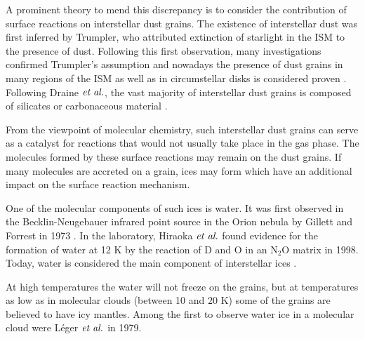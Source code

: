 \documentclass[8.5pt,twoside,twocolumn]{article}
\theoremstyle{standard}
\begin{document}
A prominent theory to mend this discrepancy is to consider the
contribution of surface reactions on interstellar dust
grains\cite{WilliamsHerbst2002}. The existence of interstellar dust was first
inferred by Trumpler\cite{Trumpler1930}, who attributed extinction of starlight
in the ISM to the presence of dust. Following this first observation, many
investigations confirmed Trumpler's assumption and nowadays the presence of
dust grains in many regions of the ISM as well as in circumstellar disks is
considered proven
\cite{Zook2001,WestphalStroudBechtelEtAl2014}. Following Draine $\emph{et al.}$,
the vast majority of interstellar dust grains is composed of silicates or
carbonaceous material \cite{Draine2003}.

From the viewpoint of molecular chemistry, such interstellar dust grains can
serve as a catalyst for reactions that would not usually take place in the
gas phase. The molecules formed by these surface reactions may remain on the
dust grains. If many molecules are accreted on a grain, ices may form which have
an additional impact on the surface reaction mechanism.

One of the molecular components of such ices is water. It was first observed
in the Becklin-Neugebauer infrared point source in the Orion
nebula\cite{BecklinNeugebauer1967} by Gillett and Forrest in 1973
\cite{GillettForrest1973}. In the laboratory, Hiraoka $\emph{et al.}$ found evidence
for the formation of water at 12 K by the reaction of D and O in an N$_2$O
matrix in 1998\cite{Hiraoka1998}. Today, water is considered the main component
of interstellar ices \cite{BoogertGerakinesWhittet2015}. 


At high temperatures the water will not freeze on the grains, but at
temperatures as low as in molecular clouds (between 10 and 20
K\cite{Ferriere2001}) some of the grains are believed to have icy mantles.
Among the first to observe water ice in a molecular cloud were Léger $\emph{et al.}$ in
1979\cite{Leger1979}.
\end{document}
